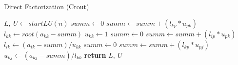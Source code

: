 \documentclass{article}
\begin{document}
  \begin{algorithm}
    \caption{Direct Factorization (Crout)}
    \begin{algorithmic}[1]
        \State $L,\ U \gets startLU(n)$
          \State $summ \gets 0$
            \State $summ \gets summ + (l_{kp} * u_{pk})$
          \EndFor
          \State $l_{kk} \gets root(a_{kk} - summ)$
          \State $u_{kk} \gets 1$
            \State $summ \gets 0$
              \State $summ \gets summ + (l_{ip} * u_{pk})$
            \EndFor
            \State $l_{ik} \gets (a_{ik} - summ) / u_{kk}$
          \EndFor
            \State $summ \gets 0$
              \State $summ \gets summ + (l_{kp} * u_{pj})$
            \EndFor
            \State $u_{kj} \gets (a_{kj} - summ) / l_{kk}$
          \EndFor
        \EndFor
        \State \textbf{return} $L,\ U$
      \EndProcedure
    \end{algorithmic}
  \end{algorithm}
\end{document}
